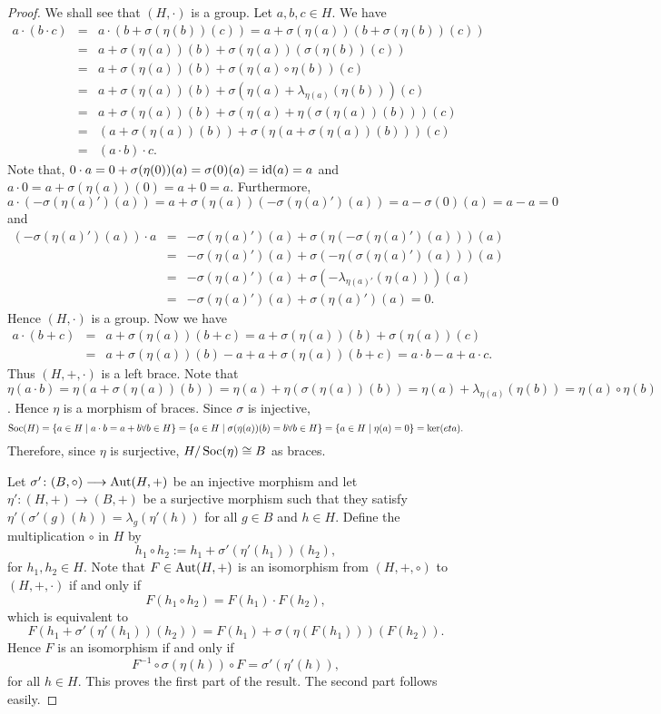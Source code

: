 \begin{proof}
We shall see that $(H,\cdot)$ is a group. Let $a,b,c\in H$. We have
	\begin{eqnarray*}
		a\cdot (b\cdot c)&=&a\cdot (b+\sigma(\eta (b))(c))=a+\sigma(\eta (a))(b+\sigma(\eta (b))(c))\\
		&=&a+\sigma(\eta (a))(b)+\sigma(\eta (a))(\sigma(\eta (b))(c))\\
		&=&a+\sigma(\eta(a))(b)+\sigma(\eta(a)\circ \eta(b))(c)\\
		&=&a+\sigma(\eta(a))(b)+\sigma(\eta(a)+\lambda_{\eta(a)}(\eta(b)))(c)\\
		&=&a+\sigma(\eta(a))(b)+\sigma(\eta(a)+\eta(\sigma(\eta(a))(b)))(c)\\
		&=&(a+\sigma(\eta(a))(b))+\sigma(\eta(a+\sigma(\eta(a))(b)))(c)\\
		&=&(a\cdot b)\cdot c.
	\end{eqnarray*}	
Note that, $0\cdot a=0+\sigma(\eta(0))(a)=\sigma(0)(a)=\operatorname{id}(a)=a$ and $a\cdot 0=a+\sigma(\eta(a))(0)=a+0=a$. Furthermore,
$a\cdot (-\sigma(\eta(a)')(a))=a+\sigma(\eta(a))(-\sigma(\eta(a)')(a))=a-\sigma(0)(a)=a-a=0$ and
\begin{eqnarray*}
	(-\sigma(\eta(a)')(a))\cdot a&=&-\sigma(\eta(a)')(a)+\sigma(\eta(-\sigma(\eta(a)')(a)))(a)\\
	&=&-\sigma(\eta(a)')(a)+\sigma(-\eta(\sigma(\eta(a)')(a)))(a)\\
	&=&-\sigma(\eta(a)')(a)+\sigma(-\lambda_{\eta(a)'}(\eta(a)))(a)\\
	&=&-\sigma(\eta(a)')(a)+\sigma(\eta(a)')(a)=0.
\end{eqnarray*}
Hence $(H,\cdot)$ is a group. Now we have
\begin{eqnarray*}
a\cdot (b+c)&=&a+\sigma(\eta(a))(b+c)=a+\sigma(\eta(a))(b)+\sigma(\eta(a))(c)\\
&=&a+\sigma(\eta(a))(b)-a+a+\sigma(\eta(a))(b+c)=a\cdot b-a+a\cdot c.
\end{eqnarray*}
Thus $(H,+,\cdot)$ is a left brace. Note that $\eta(a\cdot b)=\eta(a+\sigma(\eta(a))(b))=\eta(a)+\eta(\sigma(\eta(a))(b))=\eta(a)+\lambda_{\eta(a)}(\eta(b))=\eta(a)\circ\eta(b)$. Hence $\eta$ is a morphism of braces. Since $\sigma$ is injective, 
$$\operatorname{Soc}(H)=\{a\in H\mid a\cdot b=a+b \forall b\in H\}=\{a\in H\mid \sigma(\eta(a))(b)=b\forall b\in H\}=\{ a\in H\mid \eta(a)=0\}=\ker(eta).$$
Therefore, since $\eta$ is surjective, $H/\operatorname{Soc}(\eta)\cong B$ as braces.

Let $\sigma'\colon
(B,\circ)\longrightarrow \operatorname{Aut}(H,+)$ be an injective morphism and
let $\eta'\colon (H,+)\longrightarrow (B,+)$ be a surjective morphism
such that they satisfy $\eta'(\sigma'(g)(h))=\lambda_g(\eta'(h))$ for
all $g\in B$ and $h\in H$. Define the multiplication $\circ$ in $H$ 
by
$$h_1\circ h_2:=h_1+\sigma'(\eta' (h_1))(h_2),$$
for $h_1,h_2\in H$. Note that $F\in\operatorname{Aut}(H,+)$ is an isomorphism from $(H,+,\circ)$ to $(H,+,\cdot)$ if and only if
$$F(h_1\circ h_2)=F(h_1)\cdot F(h_2),$$
which is equivalent to
$$F(h_1+\sigma'(\eta' (h_1))(h_2))=F(h_1)+\sigma(\eta (F(h_1)))(F(h_2)).$$
Hence $F$ is an isomorphism if and only if 
$$F^{-1}\circ\sigma(\eta(h))\circ F=\sigma'(\eta'(h)),$$
for all $h\in H$. This proves the first part of the result. The second part follows easily.
\end{proof}	
